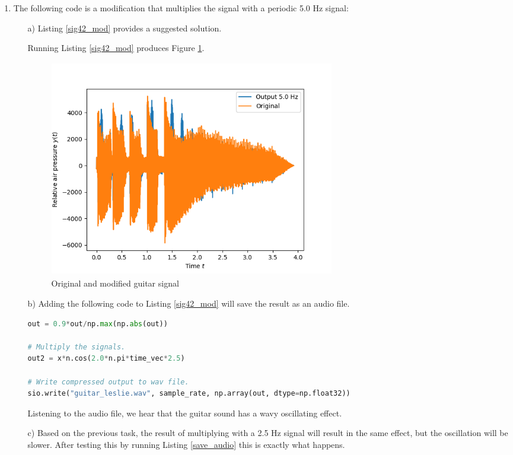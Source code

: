 \begin{enumerate}
  \item The following code is a modification that multiplies the signal with a periodic 5.0 Hz signal:
        \begin{itemize}
          \item[a)] Listing \ref{sig42_mod} provides a suggested solution.
                
                Running Listing \ref{sig42_mod} produces Figure \ref{fig:ex6b}.
                \begin{figure}[h!]
                  \centering
                  \includegraphics[width=12.5cm, height=9.5cm]{ch06/figures/ex6b.png}
                  \caption{Original and modified guitar signal}
                  \label{fig:ex6b}
                \end{figure}

          \item[b)]
                Adding the following code to Listing \ref{sig42_mod} will save the result as an audio file.
\begin{lstlisting}[language=Python, caption=Saving an audiofile, label=save_audio]
out = 0.9*out/np.max(np.abs(out)) 
    
# Multiply the signals.
out2 = x*n.cos(2.0*n.pi*time_vec*2.5)
    
# Write compressed output to wav file.
sio.write("guitar_leslie.wav", sample_rate, np.array(out, dtype=np.float32))
\end{lstlisting}
                Listening to the audio file, we hear that the guitar sound has a wavy oscillating effect.

          \item[c)]
                Based on the previous task, the result of multiplying with a 2.5 Hz signal will result in 
                the same effect, but the oscillation will be slower. After testing this 
                by running Listing \ref{save_audio} this is exactly what happens.
        \end{itemize}

\end{enumerate}

